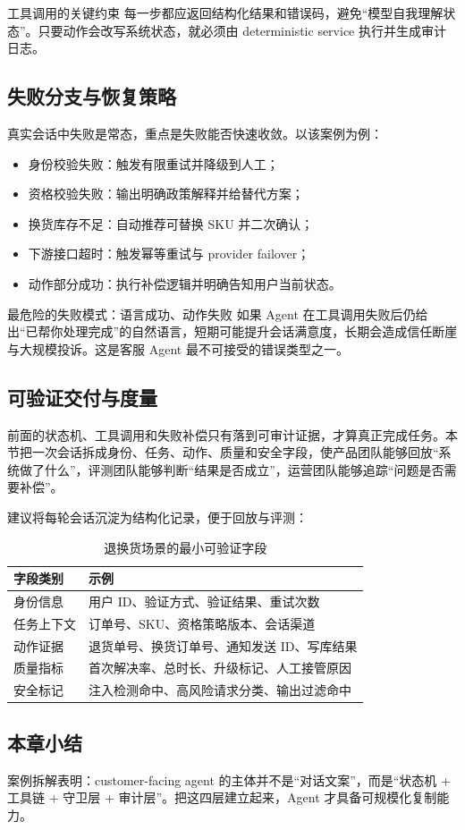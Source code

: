 \begin{importantbox}{工具调用的关键约束}
每一步都应返回结构化结果和错误码，避免“模型自我理解状态”。只要动作会改写系统状态，就必须由 deterministic service 执行并生成审计日志。
\end{importantbox}

\subsection{失败分支与恢复策略}

真实会话中失败是常态，重点是失败能否快速收敛。以该案例为例：
\begin{itemize}[leftmargin=1.5em]
    \item 身份校验失败：触发有限重试并降级到人工；
    \item 资格校验失败：输出明确政策解释并给替代方案；
    \item 换货库存不足：自动推荐可替换 SKU 并二次确认；
    \item 下游接口超时：触发幂等重试与 provider failover；
    \item 动作部分成功：执行补偿逻辑并明确告知用户当前状态。
\end{itemize}

\begin{warningbox}{最危险的失败模式：语言成功、动作失败}
如果 Agent 在工具调用失败后仍给出“已帮你处理完成”的自然语言，短期可能提升会话满意度，长期会造成信任断崖与大规模投诉。这是客服 Agent 最不可接受的错误类型之一。
\end{warningbox}

\subsection{可验证交付与度量}

前面的状态机、工具调用和失败补偿只有落到可审计证据，才算真正完成任务。本节把一次会话拆成身份、任务、动作、质量和安全字段，使产品团队能够回放“系统做了什么”，评测团队能够判断“结果是否成立”，运营团队能够追踪“问题是否需要补偿”。

建议将每轮会话沉淀为结构化记录，便于回放与评测：
\begin{table}[H]
\centering
\caption{退换货场景的最小可验证字段}
\begin{tabularx}{\textwidth}{>{\raggedright\arraybackslash}p{3.3cm} >{\raggedright\arraybackslash}X}
\toprule
字段类别 & 示例 \\
\midrule
身份信息 & 用户 ID、验证方式、验证结果、重试次数 \\
任务上下文 & 订单号、SKU、资格策略版本、会话渠道 \\
动作证据 & 退货单号、换货订单号、通知发送 ID、写库结果 \\
质量指标 & 首次解决率、总时长、升级标记、人工接管原因 \\
安全标记 & 注入检测命中、高风险请求分类、输出过滤命中 \\
\bottomrule
\end{tabularx}
\end{table}

\subsection{本章小结}

案例拆解表明：customer-facing agent 的主体并不是“对话文案”，而是“状态机 + 工具链 + 守卫层 + 审计层”。把这四层建立起来，Agent 才具备可规模化复制能力。


